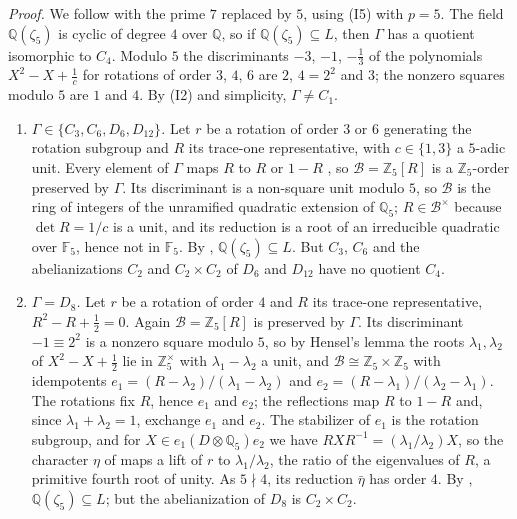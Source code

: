 \documentclass[11pt]{article}
\newcommand{\Q}{\mathbb Q}
\newcommand{\Z}{\mathbb Z}
\newcommand{\F}{\mathbb F}
\begin{document}
\emph{Proof.} We follow \cite[Section~7]{P63} with the prime \(7\) replaced by \(5\), using (I5) with
\(p=5\). The field \(\Q(\zeta_5)\) is cyclic of degree \(4\) over \(\Q\), so if
\(\Q(\zeta_5)\subseteq L\), then \(\Gamma\) has a quotient isomorphic to \(C_4\). Modulo \(5\) the
discriminants \(-3\), \(-1\), \(-\tfrac13\) of the polynomials \(X^2-X+\tfrac1c\) for rotations
of order \(3\), \(4\), \(6\) are \(2\), \(4=2^2\) and \(3\); the nonzero squares modulo \(5\) are
\(1\) and \(4\). By (I2) and simplicity, \(\Gamma\neq C_1\).
\begin{enumerate}
\item \emph{\(\Gamma\in\{C_3,C_6,D_6,D_{12}\}\).} Let \(r\) be a rotation of order \(3\) or \(6\)
generating the rotation subgroup and \(R\) its trace-one representative, with \(c\in\{1,3\}\) a
\(5\)-adic unit. Every element of \(\Gamma\) maps \(R\) to \(R\) or \(1-R\) \cite[Section~7]{P63}, so
\(\mathcal B=\Z_5[R]\) is a \(\Z_5\)-order preserved by \(\Gamma\). Its discriminant is a
non-square unit modulo \(5\), so \(\mathcal B\) is the ring of integers of the unramified
quadratic extension of \(\Q_5\); \(R\in\mathcal B^\times\) because \(\det R=1/c\) is a unit, and
its reduction is a root of an irreducible quadratic over \(\F_5\), hence not in \(\F_5\). By
\cite[Lemma~6]{P63}, \(\Q(\zeta_5)\subseteq L\). But \(C_3\), \(C_6\) and the abelianizations \(C_2\)
and \(C_2\times C_2\) of \(D_6\) and \(D_{12}\) have no quotient \(C_4\).

\item \emph{\(\Gamma=D_8\).} Let \(r\) be a rotation of order \(4\) and \(R\) its trace-one
representative, \(R^2-R+\tfrac12=0\). Again \(\mathcal B=\Z_5[R]\) is preserved by \(\Gamma\). Its
discriminant \(-1\equiv2^2\) is a nonzero square modulo \(5\), so by Hensel's lemma the roots
\(\lambda_1,\lambda_2\) of \(X^2-X+\tfrac12\) lie in \(\Z_5^\times\) with \(\lambda_1-\lambda_2\)
a unit, and \(\mathcal B\cong\Z_5\times\Z_5\) with idempotents
\(e_1=(R-\lambda_2)/(\lambda_1-\lambda_2)\) and \(e_2=(R-\lambda_1)/(\lambda_2-\lambda_1)\). The
rotations fix \(R\), hence \(e_1\) and \(e_2\); the reflections map \(R\) to \(1-R\) and, since
\(\lambda_1+\lambda_2=1\), exchange \(e_1\) and \(e_2\). The stabilizer of \(e_1\) is the rotation
subgroup, and for \(X\in e_1(D\otimes\Q_5)e_2\) we have \(RXR^{-1}=(\lambda_1/\lambda_2)X\), so
the character \(\eta\) of \cite[Lemma~7]{P63} maps a lift of \(r\) to \(\lambda_1/\lambda_2\), the
ratio of the eigenvalues of \(R\), a primitive fourth root of unity. As \(5\nmid4\), its reduction
\(\bar\eta\) has order \(4\). By \cite[Lemma~7]{P63}, \(\Q(\zeta_5)\subseteq L\); but the
abelianization of \(D_8\) is \(C_2\times C_2\).


\end{enumerate}
\end{document}
